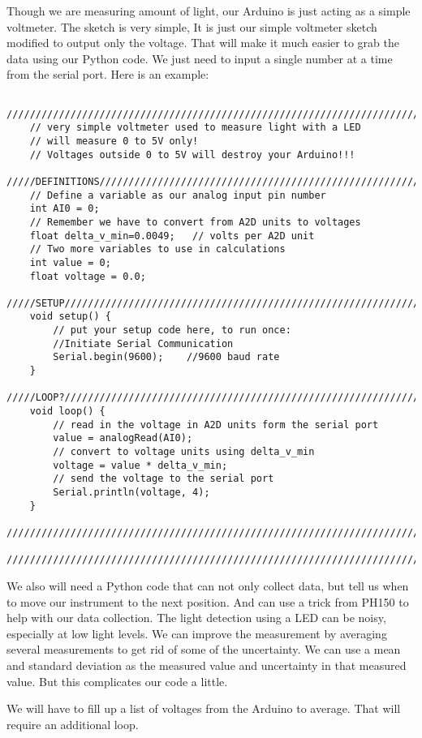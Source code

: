 Though we are measuring amount of light, our Arduino is just acting as a
simple voltmeter. The sketch is very simple, It is just our simple voltmeter
sketch modified to output only the voltage. That will make it much easier to
grab the data using our Python code. We just need to input a single number
at a time from the serial port. Here is an example:
\begin{verbatim}
	////////////////////////////////////////////////////////////////////////////
	// very simple voltmeter used to measure light with a LED
	// will measure 0 to 5V only!
	// Voltages outside 0 to 5V will destroy your Arduino!!!
	/////DEFINITIONS////////////////////////////////////////////////////////////
	// Define a variable as our analog input pin number
	int AI0 = 0;
	// Remember we have to convert from A2D units to voltages
	float delta_v_min=0.0049;   // volts per A2D unit
	// Two more variables to use in calculations
	int value = 0;
	float voltage = 0.0;
	/////SETUP/////////////////////////////////////////////////////////////////
	void setup() {
		// put your setup code here, to run once:
		//Initiate Serial Communication
		Serial.begin(9600);    //9600 baud rate
	}
	/////LOOP?/////////////////////////////////////////////////////////////////
	void loop() {
		// read in the voltage in A2D units form the serial port
		value = analogRead(AI0); 
		// convert to voltage units using delta_v_min
		voltage = value * delta_v_min;
		// send the voltage to the serial port 
		Serial.println(voltage, 4);  
	}
	////////////////////////////////////////////////////////////////////////////
	////////////////////////////////////////////////////////////////////////////
\end{verbatim}

We also will need a Python code that can not only collect data, but tell us
when to move our instrument to the next position. And can use a trick from
PH150 to help with our data collection. The light detection using a LED can
be noisy, especially at low light levels. We can improve the measurement by
averaging several measurements to get rid of some of the uncertainty. We can
use a mean and standard deviation as the measured value and uncertainty in
that measured value. But this complicates our code a little.

We will have to fill up a list of voltages from the Arduino to average. That
will require an additional loop.

